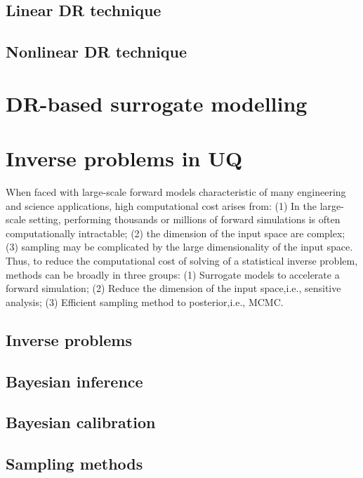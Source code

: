 \subsection{Linear DR technique}

\subsection{Nonlinear DR technique}

\section{DR-based surrogate modelling}

\section{Inverse problems in UQ}

When faced with large-scale forward models characteristic of many engineering and science applications, high computational cost arises from: (1) In the large-scale setting, performing thousands or millions of forward simulations is often computationally intractable; (2)  the dimension of the input space are complex; (3) sampling may be complicated by the large dimensionality of the input space. Thus, to reduce the computational cost of solving of a statistical inverse problem, methods can be broadly in three groups: (1) Surrogate models to accelerate a forward simulation; (2) Reduce the dimension of the input space,i.e., sensitive analysis; (3) Efficient sampling method to posterior,i.e., MCMC.



\subsection{Inverse problems}

\subsection{Bayesian inference}

\subsection{Bayesian calibration}

\subsection{Sampling methods}

